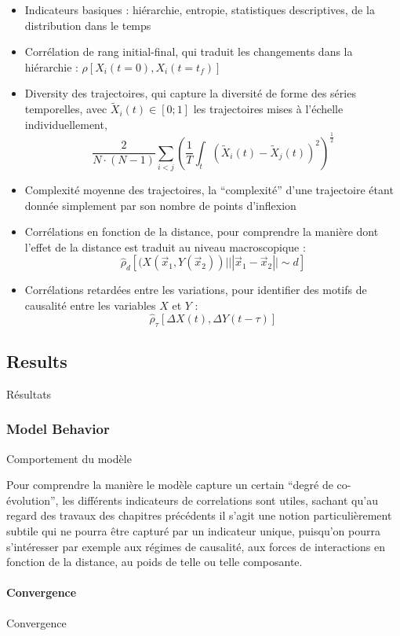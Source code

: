 \begin{itemize}
  \item Indicateurs basiques : hiérarchie, entropie, statistiques descriptives, de la distribution dans le temps
  \item Corrélation de rang initial-final, qui traduit les changements dans la hiérarchie : $\rho\left[X_i(t=0),X_i(t=t_f)\right]$
  \item Diversity des trajectoires, qui capture la diversité de forme des séries temporelles, avec $\tilde{X}_i(t)\in \left[0;1\right]$ les trajectoires mises à l'échelle individuellement,
\[
\frac{2}{N\cdot(N-1)}\sum_{i<j} \left(\frac{1}{T}\int_{t} \left(\tilde{X}_i(t) - \tilde{X}_j(t)\right)^2 \right)^{\frac{1}{2}}
\]
\item Complexité moyenne des trajectoires, la ``complexité'' d'une trajectoire étant donnée simplement par son nombre de points d'inflexion
\item Corrélations en fonction de la distance, pour comprendre la manière dont l'effet de la distance est traduit au niveau macroscopique : 
\[
\hat{\rho}_d\left[(X(\vec{x}_1,Y(\vec{x}_2))|||\vec{x}_1-\vec{x}_2||\sim d\right]
\]
\item Corrélations retardées entre les variations, pour identifier des motifs de causalité entre les variables $X$ et $Y$ : \[
\hat{\rho}_{\tau}\left[\Delta X(t),\Delta Y(t-\tau)\right]
\]
\end{itemize}




\subsection{Results}{Résultats}


\subsubsection{Model Behavior}{Comportement du modèle}


Pour comprendre la manière le modèle capture un certain ``degré de co-évolution'', les différents indicateurs de correlations sont utiles, sachant qu'au regard des travaux des chapitres précédents il s'agit une notion particulièrement subtile qui ne pourra être capturé par un indicateur unique, puisqu'on pourra s'intéresser par exemple aux régimes de causalité, aux forces de interactions en fonction de la distance, au poids de telle ou telle composante.


\paragraph{Convergence}{Convergence}

